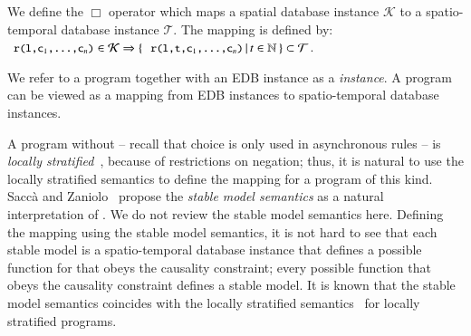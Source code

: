 We define the $\Box$ operator which maps a spatial database instance $\mathcal{K}$ to a spatio-temporal database instance $\mathcal{T}$.  The mapping is defined by: $\dedalus{r(l,c\sub{1},\ldots,c\sub{n})} \in \mathcal{K} \Rightarrow \{ \, \dedalus{r(l,t,c\sub{1},\ldots,c\sub{n})} \, | \, t \in \mathbb{N} \, \} \subset \mathcal{T}$. 

We refer to a \lang program together with an EDB instance as a {\em \lang instance}.  A \lang program can be viewed as a mapping from EDB instances to spatio-temporal database instances.

A \lang program without  -- recall that choice is only used in asynchronous rules -- is {\em locally stratified}~\cite{local-strat}, because of restrictions on negation; thus, it is natural to use the locally stratified semantics to define the mapping for a \lang program of this kind.  Sacc\`{a} and Zaniolo~\cite{sacca-zaniolo} propose the {\em stable model semantics} as a natural interpretation of .  We do not review the stable model semantics here.  Defining the mapping using the stable model semantics, it is not hard to see that each stable model is a spatio-temporal database instance that defines a possible function for  that obeys the causality constraint; every possible function that obeys the causality constraint defines a stable model.  It is known that the stable model semantics coincides with the locally stratified semantics~\cite{stable-model} for locally stratified programs.

